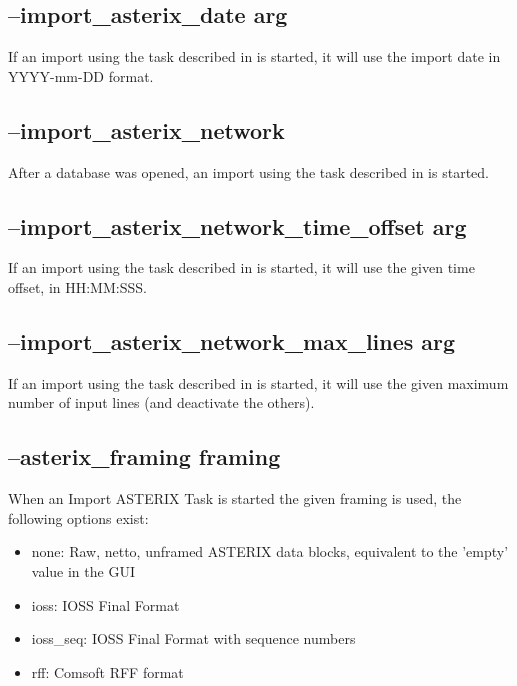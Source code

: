 \subsection{--import\_asterix\_date arg}

If an import using the task described in  is started, it will use the import date in YYYY-mm-DD format.


\subsection{--import\_asterix\_network}

After a database was opened, an import using the task described in  is started.

\subsection{--import\_asterix\_network\_time\_offset arg}

If an import using the task described in  is started, it will use the given time offset, in HH:MM:SSS.

\subsection{--import\_asterix\_network\_max\_lines arg}

If an import using the task described in  is started, it will use the given maximum number of input lines (and deactivate the others).

\subsection{--asterix\_framing framing}

When an Import ASTERIX Task is started the given framing is used, the following options exist:

\begin{itemize}
\item none:  Raw, netto, unframed ASTERIX data blocks, equivalent to the 'empty' value in the GUI
\item ioss:  IOSS Final Format
\item ioss\_seq: IOSS Final Format with sequence numbers
\item rff: Comsoft RFF format
\end{itemize}

